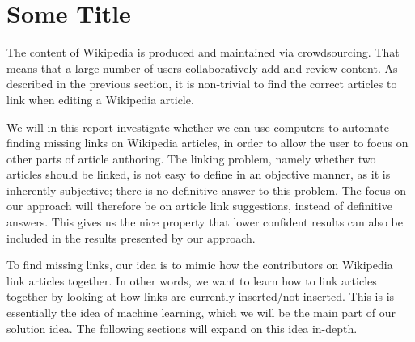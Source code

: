 \section{Some Title}



The content of Wikipedia is produced and maintained via crowdsourcing. That means that a large number of users collaboratively add and review content. As described in the previous section, it is non-trivial to find the correct articles to link when editing a Wikipedia article.

We will in this report investigate whether we can use computers to automate finding missing links on Wikipedia articles, in order to allow the user to focus on other parts of article authoring. The linking problem, namely whether two articles should be linked, is not easy to define in an objective manner, as it is inherently subjective; there is no definitive answer to this problem. The focus on our approach will therefore be on article link suggestions, instead of definitive answers. This gives us the nice property that lower confident results can also be included in the results presented by our approach.

To find missing links, our idea is to mimic how the contributors on Wikipedia link articles together. In other words, we want to learn how to link articles together by looking at how links are currently inserted/not inserted. This is is essentially the idea of machine learning, which we will be the main part of our solution idea. The following sections will expand on this idea in-depth.
